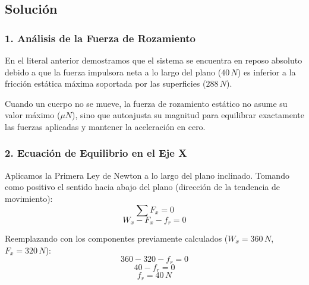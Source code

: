 \documentclass[12pt, a4paper]{article}
\begin{document}
\begin{center}
\end{center}

\subsection*{Solución}

\subsubsection*{1. Análisis de la Fuerza de Rozamiento}
En el literal anterior demostramos que el sistema se encuentra en reposo absoluto debido a que la fuerza impulsora neta a lo largo del plano ($40 \, \si{N}$) es inferior a la fricción estática máxima soportada por las superficies ($288 \, \si{N}$).

Cuando un cuerpo no se mueve, la fuerza de rozamiento estático no asume su valor máximo ($\mu N$), sino que autoajusta su magnitud para equilibrar exactamente las fuerzas aplicadas y mantener la aceleración en cero.

\subsubsection*{2. Ecuación de Equilibrio en el Eje X}
Aplicamos la Primera Ley de Newton a lo largo del plano inclinado. Tomando como positivo el sentido hacia abajo del plano (dirección de la tendencia de movimiento):
$$ \sum F_x = 0 $$
$$ W_x - F_x - f_r = 0 $$

Reemplazando con los componentes previamente calculados ($W_x = 360 \, \si{N}$, $F_x = 320 \, \si{N}$):
$$ 360 - 320 - f_r = 0 $$
$$ 40 - f_r = 0 $$
$$ f_r = 40 \, \si{N} $$
\end{document}
